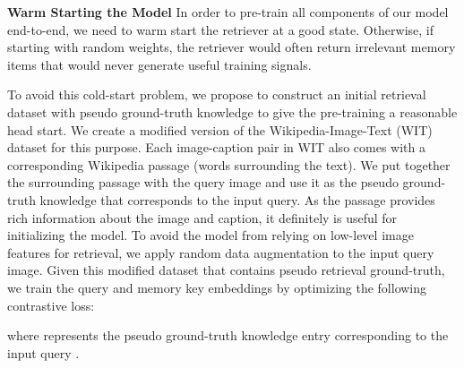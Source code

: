 \documentclass[10pt,twocolumn,letterpaper]{article}
\begin{document}
\textbf{Warm Starting the Model} In order to pre-train all components of our model end-to-end, we need to warm start the retriever at a good state. Otherwise, if starting with random weights, the retriever would often return irrelevant memory items that would never generate useful training signals.


To avoid this cold-start problem, we propose to construct an initial retrieval dataset with pseudo ground-truth knowledge to give the pre-training a reasonable head start. We create a modified version of the Wikipedia-Image-Text (WIT)~\cite{DBLP:conf/sigir/Srinivasan0CBN21} dataset for this purpose. Each image-caption pair in WIT also comes with a corresponding Wikipedia passage (words surrounding the text). We put together the surrounding passage with the query image and use it as the pseudo ground-truth knowledge that corresponds to the input query. As the passage provides rich information about the image and caption, it definitely is useful for initializing the model. To avoid the model from relying on low-level image features for retrieval, we apply random data augmentation to the input query image.  Given this modified dataset that contains pseudo retrieval ground-truth, we train the query and memory key embeddings by optimizing the following contrastive loss: 

where  represents the pseudo ground-truth knowledge entry corresponding to the input query .
\end{document}
